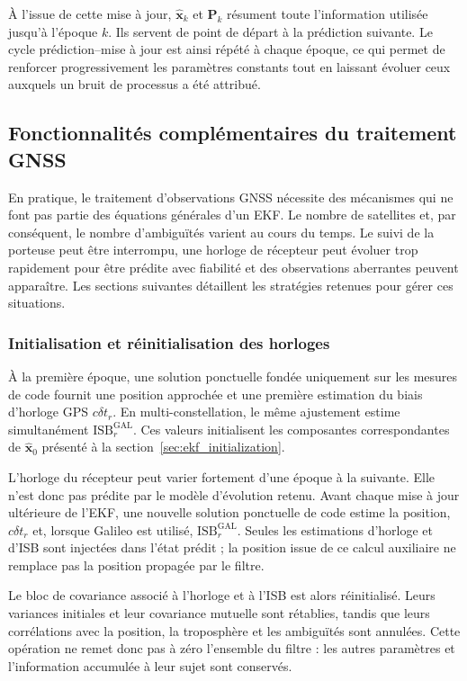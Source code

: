 À l'issue de cette mise à jour, $\widehat{\mathbf x}_k$ et $\mathbf P_k$
résument toute l'information utilisée jusqu'à l'époque $k$. Ils servent de
point de départ à la prédiction suivante. Le cycle prédiction--mise à jour est
ainsi répété à chaque époque, ce qui permet de renforcer progressivement les
paramètres constants tout en laissant évoluer ceux auxquels un bruit de
processus a été attribué.

\subsection{Fonctionnalités complémentaires du traitement GNSS}
\label{sec:ekf_gnss_features}

En pratique, le traitement d'observations GNSS nécessite des mécanismes qui ne
font pas partie des équations générales d'un EKF. Le nombre de satellites et,
par conséquent, le nombre d'ambiguïtés varient au cours du temps. Le suivi de
la porteuse peut être interrompu, une horloge de récepteur peut évoluer trop
rapidement pour être prédite avec fiabilité et des observations aberrantes
peuvent apparaître. Les sections suivantes détaillent les stratégies retenues pour gérer ces situations.

\subsubsection{Initialisation et réinitialisation des horloges}

À la première époque, une solution ponctuelle fondée uniquement sur les
mesures de code fournit une position approchée et une première estimation du
biais d'horloge GPS $c\delta t_r$. En multi-constellation, le même ajustement
estime simultanément $\mathrm{ISB}_r^{\mathrm{GAL}}$. Ces valeurs initialisent
les composantes correspondantes de $\widehat{\mathbf x}_0$ présenté à la
section~\ref{sec:ekf_initialization}.

L'horloge du récepteur peut varier fortement d'une époque à la suivante. Elle
n'est donc pas prédite par le modèle d'évolution retenu. Avant chaque mise à
jour ultérieure de l'EKF, une nouvelle solution ponctuelle de code estime la
position, $c\delta t_r$ et, lorsque Galileo est utilisé,
$\mathrm{ISB}_r^{\mathrm{GAL}}$. Seules les estimations d'horloge et d'ISB sont
injectées dans l'état prédit ; la position issue de ce calcul auxiliaire ne
remplace pas la position propagée par le filtre.

Le bloc de covariance associé à l'horloge et à l'ISB est alors réinitialisé.
Leurs variances initiales et leur covariance mutuelle sont rétablies, tandis
que leurs corrélations avec la position, la troposphère et les ambiguïtés sont
annulées. Cette opération ne remet donc pas à zéro l'ensemble du filtre : les
autres paramètres et l'information accumulée à leur sujet sont conservés.

